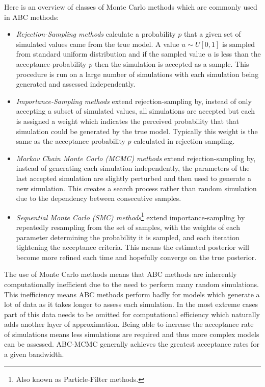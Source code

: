 \documentclass[11pt,a4paper]{article}
\theoremstyle{break}
\begin{document}
  \par Here is an overview of classes of Monte Carlo methods which are commonly used in ABC methods:
  \begin{itemize}
    \item \textit{Rejection-Sampling methods} calculate a probability $p$ that a given set of simulated values came from the true model. A value $u\sim U[0,1]$ is sampled from standard uniform distribution and if the sampled value $u$ is less than the acceptance-probability $p$ then the simulation is accepted as a sample. This procedure is run on a large number of simulations with each simulation being generated and assessed independently.

    \item \textit{Importance-Sampling methods} extend rejection-sampling by, instead of only accepting a subset of simulated values, all simulations are accepted but each is assigned a weight which indicates the perceived probability that that simulation could be generated by the true model. Typically this weight is the same as the acceptance probability $p$ calculated in rejection-sampling.

    \item \textit{Markov Chain Monte Carlo (MCMC) methods} extend rejection-sampling by, instead of generating each simulation independently, the parameters of the last accepted simulation are slightly perturbed and then used to generate a new simulation. This creates a search process rather than random simulation due to the dependency between consecutive samples.

    \item \textit{Sequential Monte Carlo (SMC) methods}\footnote{Also known as Particle-Filter methods.} extend importance-sampling by repeatedly resampling from the set of samples, with the weights of each parameter determining the probability it is sampled, and each iteration tightening the acceptance criteria. This means the estimated posterior will become more refined each time and hopefully converge on the true posterior.
  \end{itemize}

  \par The use of Monte Carlo methods means that ABC methods are inherently computationally inefficient due to the need to perform many random simulations. This inefficiency means ABC methods perform badly for models which generate a lot of data as it takes longer to assess each simulation. In the most extreme cases part of this data needs to be omitted for computational efficiency which naturally adds another layer of approximation. Being able to increase the acceptance rate of simulations means less simulations are required and thus more complex models can be assessed. ABC-MCMC generally achieves the greatest acceptance rates for a given bandwidth.
\end{document}
